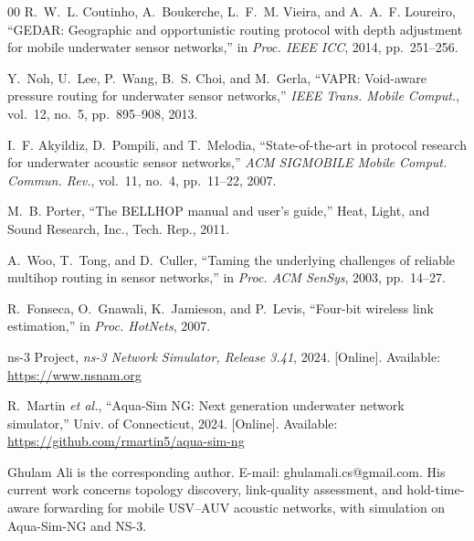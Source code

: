 \documentclass[journal]{IEEEtran}
\begin{document}
\begin{thebibliography}{00}
R.~W.~L. Coutinho, A.~Boukerche, L.~F.~M. Vieira, and A.~A.~F. Loureiro, ``{GEDAR}: Geographic and opportunistic routing protocol with depth adjustment for mobile underwater sensor networks,'' in \emph{Proc. {IEEE} ICC}, 2014, pp.~251--256.

Y.~Noh, U.~Lee, P.~Wang, B.~S. Choi, and M.~Gerla, ``{VAPR}: Void-aware pressure routing for underwater sensor networks,'' \emph{{IEEE} Trans. Mobile Comput.}, vol.~12, no.~5, pp.~895--908, 2013.

I.~F. Akyildiz, D.~Pompili, and T.~Melodia, ``State-of-the-art in protocol research for underwater acoustic sensor networks,'' \emph{{ACM} {SIGMOBILE} Mobile Comput. Commun. Rev.}, vol.~11, no.~4, pp.~11--22, 2007.

M.~B. Porter, ``The {BELLHOP} manual and user's guide,'' Heat, Light, and Sound Research, Inc., Tech. Rep., 2011.

A.~Woo, T.~Tong, and D.~Culler, ``Taming the underlying challenges of reliable multihop routing in sensor networks,'' in \emph{Proc. {ACM} SenSys}, 2003, pp.~14--27.

R.~Fonseca, O.~Gnawali, K.~Jamieson, and P.~Levis, ``Four-bit wireless link estimation,'' in \emph{Proc. HotNets}, 2007.

ns-3 Project, \emph{ns-3 Network Simulator, Release 3.41}, 2024. [Online]. Available: \url{https://www.nsnam.org}

R.~Martin \emph{et al.}, ``Aqua-{Sim} {NG}: Next generation underwater network simulator,'' Univ. of Connecticut, 2024. [Online]. Available: \url{https://github.com/rmartin5/aqua-sim-ng}

\end{thebibliography}

\begin{IEEEbiographynophoto}{Ghulam Ali}
is the corresponding author. E-mail: ghulamali.cs@gmail.com.
His current work concerns topology discovery, link-quality assessment,
and hold-time-aware forwarding for mobile USV--AUV acoustic networks,
with simulation on Aqua-Sim-NG and NS-3.
\end{IEEEbiographynophoto}
\end{document}

